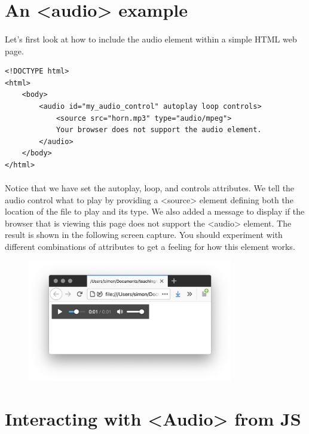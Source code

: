 \section{An <audio> example}

\paragraph{} Let's first look at how to include the audio element within a simple HTML web page. 

\begin{lstlisting}
<!DOCTYPE html>
<html>
    <body>
        <audio id="my_audio_control" autoplay loop controls>
            <source src="horn.mp3" type="audio/mpeg">
            Your browser does not support the audio element.
        </audio>
    </body>
</html>
\end{lstlisting}

\paragraph{} Notice that we have set the autoplay, loop, and controls attributes. We tell the audio control what to play by providing a <source> element defining both the location of the file to play and its type. We also added a message to display if the browser that is viewing this page does not support the <audio> element. The result is shown in the following screen capture. You should experiment with different combinations of attributes to get a feeling for how this element works.

\begin{figure}[H]
\centering
\includegraphics[width=0.8\textwidth]{figures/audio-ui}
\label{fig:audio-ui}
\caption{}
\end{figure}

\section{Interacting with <Audio> from JS}
